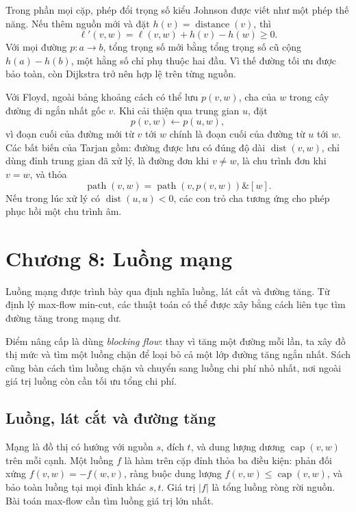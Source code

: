 \documentclass[11pt]{article}
\begin{document}
Trong phần mọi cặp, phép đổi trọng số kiểu Johnson được viết như một phép thế
năng. Nếu thêm nguồn mới và đặt \(h(v)=\operatorname{distance}(v)\), thì
\[
  \ell'(v,w)=\ell(v,w)+h(v)-h(w)\ge0.
\]
Với mọi đường \(p:a\to b\), tổng trọng số mới bằng tổng trọng số cũ cộng
\(h(a)-h(b)\), một hằng số chỉ phụ thuộc hai đầu. Vì thế đường tối ưu được bảo
toàn, còn Dijkstra trở nên hợp lệ trên từng nguồn.

Với Floyd, ngoài bảng khoảng cách có thể lưu \(p(v,w)\), cha của \(w\) trong cây
đường đi ngắn nhất gốc \(v\). Khi cải thiện qua trung gian \(u\), đặt
\[
  p(v,w)\leftarrow p(u,w),
\]
vì đoạn cuối của đường mới từ \(v\) tới \(w\) chính là đoạn cuối của đường từ
\(u\) tới \(w\). Các bất biến của Tarjan gồm: đường được lưu có đúng độ dài
\(\operatorname{dist}(v,w)\), chỉ dùng đỉnh trung gian đã xử lý, là đường đơn
khi \(v\ne w\), là chu trình đơn khi \(v=w\), và thỏa
\[
  \operatorname{path}(v,w)
  =\operatorname{path}(v,p(v,w))\mathbin{\&}[w].
\]
Nếu trong lúc xử lý có \(\operatorname{dist}(u,u)<0\), các con trỏ cha tương
ứng cho phép phục hồi một chu trình âm.

\section{Chương 8: Luồng mạng}

Luồng mạng được trình bày qua định nghĩa luồng, lát cắt và đường tăng. Từ
định lý max-flow min-cut, các thuật toán có thể được xây bằng cách liên tục
tìm đường tăng trong mạng dư.

Điểm nâng cấp là dùng \emph{blocking flow}: thay vì tăng một đường mỗi lần,
ta xây đồ thị mức và tìm một luồng chặn để loại bỏ cả một lớp đường tăng
ngắn nhất. Sách cũng bàn cách tìm luồng chặn và chuyển sang luồng chi phí nhỏ
nhất, nơi ngoài giá trị luồng còn cần tối ưu tổng chi phí.

\subsection*{Luồng, lát cắt và đường tăng}

Mạng là đồ thị có hướng với nguồn \(s\), đích \(t\), và dung lượng dương
\(\operatorname{cap}(v,w)\) trên mỗi cạnh. Một luồng \(f\) là hàm trên cặp đỉnh
thỏa ba điều kiện: phản đối xứng \(f(v,w)=-f(w,v)\), ràng buộc dung lượng
\(f(v,w)\le \operatorname{cap}(v,w)\), và bảo toàn luồng tại mọi đỉnh khác
\(s,t\). Giá trị \(|f|\) là tổng luồng ròng rời nguồn. Bài toán max-flow cần
tìm luồng giá trị lớn nhất.
\end{document}
